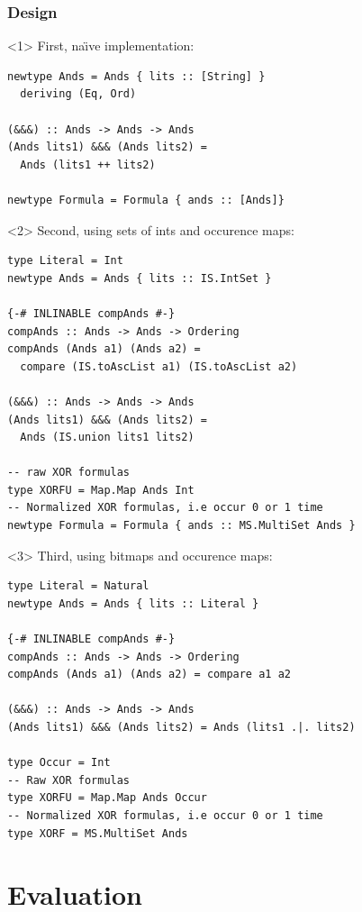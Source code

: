 \documentclass{beamer}
\begin{document}
\begin{frame}[fragile,t]
  \frametitle{Design}
\begin{onlyenv}<1>
First, na\"{\i}ve implementation:
\begin{verbatim}
newtype Ands = Ands { lits :: [String] }
  deriving (Eq, Ord)

(&&&) :: Ands -> Ands -> Ands
(Ands lits1) &&& (Ands lits2) = 
  Ands (lits1 ++ lits2)

newtype Formula = Formula { ands :: [Ands]}
\end{verbatim}
\end{onlyenv}

\begin{onlyenv}<2>
Second, using sets of ints and occurence maps:
\begin{verbatim}
type Literal = Int
newtype Ands = Ands { lits :: IS.IntSet }

{-# INLINABLE compAnds #-}
compAnds :: Ands -> Ands -> Ordering
compAnds (Ands a1) (Ands a2) = 
  compare (IS.toAscList a1) (IS.toAscList a2)

(&&&) :: Ands -> Ands -> Ands
(Ands lits1) &&& (Ands lits2) = 
  Ands (IS.union lits1 lits2)

-- raw XOR formulas
type XORFU = Map.Map Ands Int
-- Normalized XOR formulas, i.e occur 0 or 1 time
newtype Formula = Formula { ands :: MS.MultiSet Ands }
\end{verbatim}
\end{onlyenv}

\begin{onlyenv}<3>
Third, using bitmaps and occurence maps:
\begin{verbatim}
type Literal = Natural
newtype Ands = Ands { lits :: Literal }

{-# INLINABLE compAnds #-}
compAnds :: Ands -> Ands -> Ordering
compAnds (Ands a1) (Ands a2) = compare a1 a2

(&&&) :: Ands -> Ands -> Ands
(Ands lits1) &&& (Ands lits2) = Ands (lits1 .|. lits2)

type Occur = Int
-- Raw XOR formulas
type XORFU = Map.Map Ands Occur
-- Normalized XOR formulas, i.e occur 0 or 1 time
type XORF = MS.MultiSet Ands
\end{verbatim}
\end{onlyenv}

\end{frame}


\section[Evaluation]{Evaluation}
\end{document}
